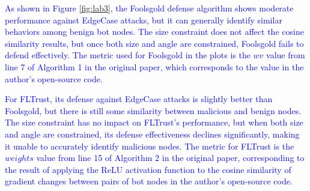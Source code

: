 \documentclass[a4paper,twoside,11pt,dvipsnames]{reviewresponse}
\begin{document}

\textcolor{blue}{As shown in Figure \ref{fig:lab3}, the Foolsgold defense algorithm shows moderate performance against EdgeCase attacks, but it can generally identify similar behaviors among benign bot nodes. The size constraint does not affect the cosine similarity results, but once both size and angle are constrained, Foolsgold fails to defend effectively. The metric used for Foolsgold in the plots is the $wv$ value from line 7 of Algorithm 1 in the original paper, which corresponds to the value in the author's open-source code.}

\textcolor{blue}{For FLTrust, its defense against EdgeCase attacks is slightly better than Foolsgold, but there is still some similarity between malicious and benign nodes. The size constraint has no impact on FLTrust's performance, but when both size and angle are constrained, its defense effectiveness declines significantly, making it unable to accurately identify malicious nodes. The metric for FLTrust is the $weights$ value from line 15 of Algorithm 2 in the original paper, corresponding to the result of applying the ReLU activation function to the cosine similarity of gradient changes between pairs of bot nodes in the author's open-source code.}
\end{document}
